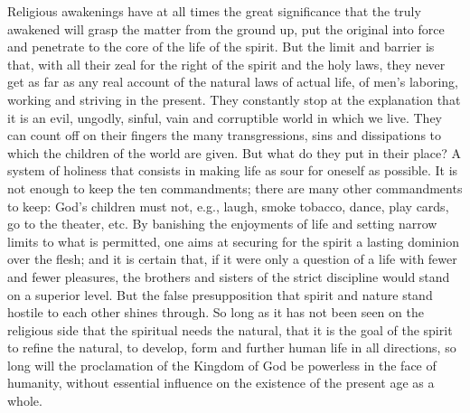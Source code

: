 \documentclass[12pt,a4paper,openany]{book}
\newcommand{\opage}[1]{\marginnote{\footnotesize\textit{[#1]}}}
\begin{document}
Religious awakenings have at all times the great significance that the
truly awakened will grasp the matter from the ground up, put the
original into force and penetrate to the core of the life of the spirit.
But the limit and barrier is that, with all their zeal for the right of
the spirit and the holy laws, they never get as far as any real account
of the natural laws of actual life, of men's laboring, working and
striving in the present. They constantly stop at the explanation that it
is an evil, ungodly, sinful, vain and corruptible world in which we live.
They can count off on their fingers the many transgressions, sins and
dissipations to which the children of the world are given. But what do
they put in their place? A system of holiness that consists in making
life as sour for oneself as possible. It is not enough to keep the ten
commandments; there are many other commandments to keep: God's children
must not, e.g., laugh, smoke tobacco, dance, play cards, go to the
theater, etc. By banishing the enjoyments of life and setting narrow
limits to what is permitted, one aims at securing for the spirit a
lasting dominion over \opage{102}the flesh; and it is certain that, if it were only
a question of a life with fewer and fewer pleasures, the brothers and
sisters of the strict discipline would stand on a superior level. But the
false presupposition that spirit and nature stand hostile to each other
shines through. So long as it has not been seen on the religious side
that the spiritual needs the natural, that it is the goal of the spirit
to refine the natural, to develop, form and further human life in all
directions, so long will the proclamation of the Kingdom of God be
powerless in the face of humanity, without essential influence on the
existence of the present age as a whole.
\end{document}
